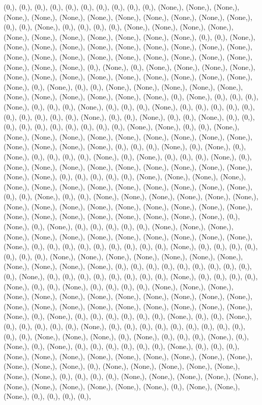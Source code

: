 \documentclass{article}
\begin{document}
(0,), (0,), (0,), (0,), (0,), (0,), (0,), (0,), (0,), (0,), (None,), (None,), (None,), (None,), (None,), (None,), (None,), (None,), (None,), (None,), (None,), (None,), (0,), (0,), (None,), (0,), (0,), (0,), (0,), (None,), (None,), (None,), (None,), (None,), (None,), (None,), (None,), (None,), (None,), (None,), (0,), (0,), (None,), (None,), (None,), (None,), (None,), (None,), (None,), (None,), (None,), (None,), (None,), (None,), (None,), (None,), (None,), (None,), (None,), (None,), (None,), (None,), (None,), (None,), (0,), (None,), (0,), (None,), (None,), (None,), (None,), (None,), (None,), (None,), (None,), (None,), (None,), (None,), (None,), (None,), (None,), (0,), (None,), (0,), (0,), (None,), (None,), (None,), (None,), (None,), (None,), (None,), (None,), (None,), (None,), (None,), (0,), (None,), (0,), (0,), (0,), (None,), (0,), (0,), (0,), (None,), (0,), (0,), (0,), (None,), (0,), (0,), (0,), (0,), (0,), (0,), (0,), (0,), (0,), (0,), (None,), (0,), (0,), (None,), (0,), (0,), (None,), (0,), (0,), (0,), (0,), (0,), (0,), (0,), (0,), (0,), (0,), (None,), (None,), (0,), (0,), (None,), (None,), (None,), (None,), (None,), (None,), (None,), (None,), (None,), (None,), (None,), (None,), (None,), (None,), (0,), (0,), (0,), (None,), (0,), (None,), (0,), (None,), (0,), (0,), (0,), (0,), (None,), (0,), (None,), (0,), (0,), (0,), (None,), (0,), (None,), (None,), (None,), (None,), (None,), (None,), (None,), (None,), (None,), (None,), (None,), (0,), (0,), (0,), (0,), (0,), (None,), (None,), (None,), (None,), (None,), (None,), (None,), (None,), (None,), (None,), (None,), (None,), (None,), (0,), (0,), (None,), (0,), (0,), (None,), (None,), (None,), (None,), (None,), (None,), (None,), (None,), (None,), (None,), (None,), (None,), (None,), (None,), (None,), (None,), (None,), (None,), (None,), (None,), (None,), (None,), (None,), (0,), (None,), (0,), (None,), (0,), (0,), (0,), (0,), (0,), (None,), (None,), (None,), (None,), (None,), (None,), (None,), (None,), (None,), (None,), (None,), (None,), (None,), (0,), (0,), (0,), (0,), (0,), (0,), (0,), (0,), (0,), (None,), (0,), (0,), (0,), (0,), (0,), (0,), (0,), (None,), (None,), (None,), (None,), (None,), (None,), (None,), (None,), (None,), (None,), (None,), (0,), (0,), (0,), (0,), (0,), (0,), (0,), (0,), (0,), (0,), (None,), (0,), (0,), (0,), (0,), (0,), (0,), (0,), (0,), (None,), (0,), (0,), (0,), (0,), (None,), (0,), (0,), (None,), (0,), (0,), (0,), (0,), (None,), (None,), (None,), (None,), (None,), (None,), (None,), (None,), (None,), (None,), (None,), (None,), (None,), (None,), (None,), (None,), (None,), (None,), (None,), (None,), (None,), (None,), (0,), (None,), (0,), (0,), (0,), (0,), (0,), (0,), (None,), (0,), (0,), (None,), (0,), (0,), (0,), (0,), (0,), (None,), (0,), (0,), (0,), (0,), (0,), (0,), (0,), (0,), (0,), (0,), (0,), (None,), (None,), (None,), (0,), (None,), (0,), (0,), (0,), (None,), (0,), (None,), (0,), (None,), (0,), (0,), (0,), (0,), (0,), (0,), (None,), (0,), (0,), (0,), (None,), (None,), (None,), (None,), (None,), (None,), (None,), (None,), (None,), (None,), (None,), (None,), (0,), (None,), (None,), (None,), (None,), (None,), (None,), (None,), (0,), (0,), (0,), (0,), (None,), (None,), (None,), (None,), (None,), (None,), (None,), (None,), (None,), (None,), (None,), (0,), (None,), (None,), (None,), (0,), (0,), (0,), (0,), 
\end{document}
